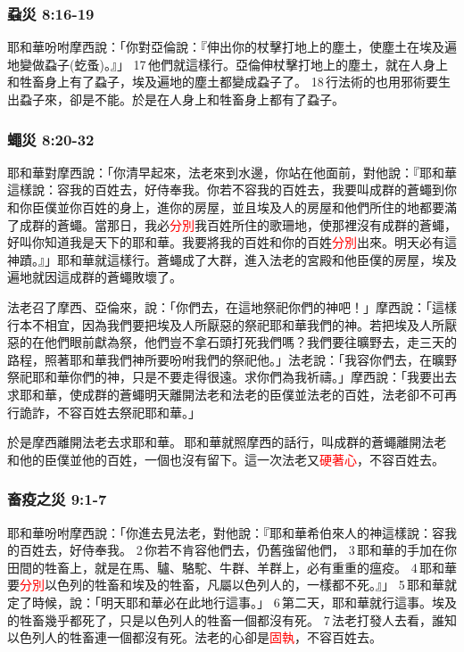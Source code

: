 \subsubsection{蝨災 8:16-19}
耶和華吩咐摩西說：「你對亞倫說：『伸出你的杖擊打地上的塵土，使塵土在埃及遍地變做蝨子(虼蚤)。』」 17 他們就這樣行。亞倫伸杖擊打地上的塵土，就在人身上和牲畜身上有了蝨子，埃及遍地的塵土都變成蝨子了。 18 行法術的也用邪術要生出蝨子來，卻是不能。於是在人身上和牲畜身上都有了蝨子。

\subsubsection{蠅災 8:20-32}
耶和華對摩西說：「你清早起來，法老來到水邊，你站在他面前，對他說：『耶和華這樣說：容我的百姓去，好侍奉我。你若不容我的百姓去，我要叫成群的蒼蠅到你和你臣僕並你百姓的身上，進你的房屋，並且埃及人的房屋和他們所住的地都要滿了成群的蒼蠅。當那日，我必\textcolor{red}{分別}我百姓所住的歌珊地，使那裡沒有成群的蒼蠅，好叫你知道我是天下的耶和華。我要將我的百姓和你的百姓\textcolor{red}{分別}出來。明天必有這神蹟。』」耶和華就這樣行。蒼蠅成了大群，進入法老的宮殿和他臣僕的房屋，埃及遍地就因這成群的蒼蠅敗壞了。

法老召了摩西、亞倫來，說：「你們去，在這地祭祀你們的神吧！」摩西說：「這樣行本不相宜，因為我們要把埃及人所厭惡的祭祀耶和華我們的神。若把埃及人所厭惡的在他們眼前獻為祭，他們豈不拿石頭打死我們嗎？我們要往曠野去，走三天的路程，照著耶和華我們神所要吩咐我們的祭祀他。」法老說：「我容你們去，在曠野祭祀耶和華你們的神，只是不要走得很遠。求你們為我祈禱。」摩西說：「我要出去求耶和華，使成群的蒼蠅明天離開法老和法老的臣僕並法老的百姓，法老卻不可再行詭詐，不容百姓去祭祀耶和華。」 

於是摩西離開法老去求耶和華。 耶和華就照摩西的話行，叫成群的蒼蠅離開法老和他的臣僕並他的百姓，一個也沒有留下。這一次法老又\textcolor{red}{硬著心}，不容百姓去。


\subsubsection{畜疫之災 9:1-7}
耶和華吩咐摩西說：「你進去見法老，對他說：『耶和華希伯來人的神這樣說：容我的百姓去，好侍奉我。 2 你若不肯容他們去，仍舊強留他們， 3 耶和華的手加在你田間的牲畜上，就是在馬、驢、駱駝、牛群、羊群上，必有重重的瘟疫。 4 耶和華要\textcolor{red}{分別}以色列的牲畜和埃及的牲畜，凡屬以色列人的，一樣都不死。』」 5 耶和華就定了時候，說：「明天耶和華必在此地行這事。」 6 第二天，耶和華就行這事。埃及的牲畜幾乎都死了，只是以色列人的牲畜一個都沒有死。 7 法老打發人去看，誰知以色列人的牲畜連一個都沒有死。法老的心卻是\textcolor{red}{固執}，不容百姓去。

